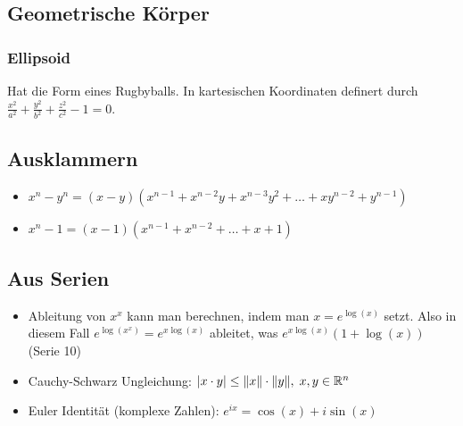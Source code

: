 \subsection{Geometrische Körper}
\subsubsection{Ellipsoid}
Hat die Form eines Rugbyballs. In kartesischen Koordinaten definert durch
$\frac{x^2}{a^2} + \frac{y^2}{b^2} + \frac{z^2}{c^2} - 1 = 0$.

\subsection{Ausklammern}
\begin{itemize}[leftmargin=*]
	\item $x^n - y^n = (x-y) (x^{n-1} + x^{n-2}y + x^{n-3}y^2 + \ldots + xy^{n-2}
	+ y^{n-1})$
	\item $x^n - 1 = (x-1)(x^{n-1} + x^{n-2} + \ldots + x + 1)$
\end{itemize}

\subsection{Aus Serien}
\begin{itemize}[leftmargin=*]
	\item Ableitung von $x^x$ kann man berechnen, indem man $x = e^{\log(x)}$
	setzt. Also in diesem Fall $e^{\log(x^x)} = e^{x \log(x)}$ ableitet, was $e^{x
	\log(x)} (1 + \log(x))$ (Serie 10)
	\item Cauchy-Schwarz Ungleichung: $|x \cdot y| \leq \|x\| \cdot \|y\|, \; x,y \in \mathbb{R}^n$
	\item Euler Identität (komplexe Zahlen): $e^{ix} = \cos(x) + i \sin(x)$
\end{itemize}

